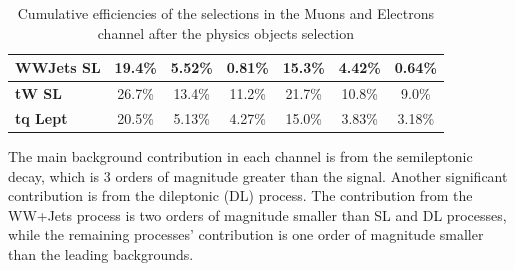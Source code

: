 \begin{table}[H]
\begin{tabular}{l|ccc||ccc}
         \midrule
         \textbf{WWJets SL}& 19.4\% & 5.52\% & 0.81\% & 15.3\% & 4.42\% & 0.64\% \\
         \midrule
         \textbf{tW SL}& 26.7\% & 13.4\%  & 11.2\% & 21.7\% &10.8\% &9.0\%  \\
         \midrule
         \textbf{tq Lept}& 20.5\%  & 5.13\% & 4.27\% & 15.0\% & 3.83\% &3.18\% \\
         \bottomrule
    \end{tabular}
    \caption{Cumulative efficiencies of the selections in the Muons and Electrons channel after the physics objects selection}
    \label{tab:event_selection}
\end{table}
\vspace{-0.5cm}
The main background contribution in each channel is from the \ttbar semileptonic decay, which is 3 orders of magnitude greater than the signal.
Another significant contribution is from the \ttbar dileptonic (DL) process. The contribution from the WW+Jets process is two orders of magnitude smaller than \ttbar SL and \ttbar DL processes, while the remaining processes' contribution is one order of magnitude smaller than the leading backgrounds. 

